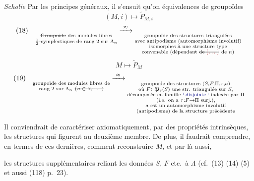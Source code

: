 \documentclass[11pt,a4paper]{article}
\begin{document}
\emph{Scholie}\quad {} Par les principes généraux, il s'ensuit qu'on   équivalences de groupoïdes
\[
(M,i)\longmapsto\widetilde{P}_{M,i}
\]
\[
\text{(18)}\quad
\underset{\substack{\text{\struck{Groupoïde} des modules libres}\\ \text{$\tfrac12$-symplectiques de rang 2 sur } \Lambda_n}}{\phantom{x}}
\xrightarrow{\ \approx\ }
\underset{\substack{\text{groupoïde des structures triangulées}\\ \text{avec antipodisme (automorphisme involutif)}\\ \text{isomorphes à une structure type}\\ \text{convenable (dépendant \struck{de \ill{}} de $n$)}}}{\phantom{x}}
\]
\[
M\longmapsto\widetilde{P}_M
\]
\[
\text{(19)}\quad
\underset{\substack{\text{groupoïde des modules libres de}\\ \text{rang 2 sur } \Lambda_n\ \text{\struck{($n\in\mathbb{N}$, …)}}}}{\phantom{x}}
\xrightarrow{\ \approx\ }
\underset{\substack{\text{groupoïde des structures } (S,F,\Pi,\tau,a)\\ \text{où } F\subset\mathfrak{P}_3(S) \text{ une str. triangulée sur } S,\\ \text{décomposée en famille \add{disjointe} indexée par } \Pi\\ \text{(i.e. on a } \tau:F\to\Pi \text{ surj.),}\\ a \text{ est un automorphisme involutif}\\ \text{(antipodisme) de la structure précédente}}}{\phantom{x}}
\]

Il conviendrait de caractériser axiomatiquement, par des propriétés intrinsèques, les structures qui figurent au deuxième membre. De plus, il faudrait comprendre, en termes de ces dernières, comment reconstruire $M$, et par là aussi,

les structures supplémentaires reliant les données $S$, $F$ etc.\ à $\Lambda$ (cf.\ (13) (14) (5) et aussi (118) p.~23).
\end{document}
